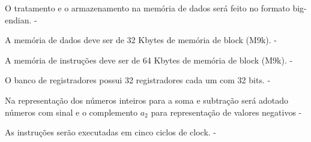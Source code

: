 \begin{nonfunctional}
	  	
        {O tratamento e o armazenamento na memória de dados será feito no formato big-endian.}
        {-}
        
        {A memória de dados deve ser de 32 Kbytes de memória de block (M9k).}
        {-}
        
        {A memória de instruções deve ser de 64 Kbytes de memória de block (M9k).}
        {-}
        
        {O banco de registradores possui 32 registradores cada um com 32 bits.}
        {-}
	  
		{Na representação dos números inteiros para a soma e subtração será adotado números com sinal e o complemento $a_{2}$ para representação de valores negativos}
		{-}
		
		{As instruções serão executadas em cinco ciclos de clock.}
		{-}		
			  
	  \end{nonfunctional}